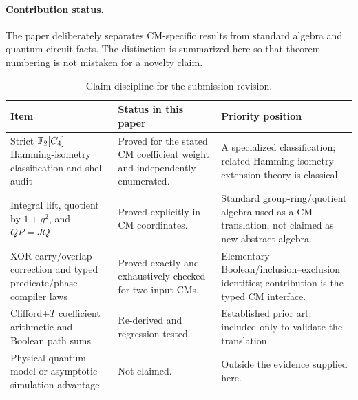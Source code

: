 \paragraph{Contribution status.}
The paper deliberately separates CM-specific results from standard algebra and quantum-circuit facts.  The distinction is summarized here so that theorem numbering is not mistaken for a novelty claim.
\begin{table}[htbp]
\centering\small
\begin{tabularx}{\textwidth}{@{}L{0.30\textwidth}Y L{0.25\textwidth}@{}}
\toprule
Item & Status in this paper & Priority position\\
\midrule
Strict $\mathbb F_2[C_4]$ Hamming-isometry classification and shell audit & Proved for the stated CM coefficient weight and independently enumerated. & A specialized classification; related Hamming-isometry extension theory is classical.\\
Integral lift, quotient by $1+g^2$, and $QP=JQ$ & Proved explicitly in CM coordinates. & Standard group-ring/quotient algebra used as a CM translation, not claimed as new abstract algebra.\\
XOR carry/overlap correction and typed predicate/phase compiler laws & Proved exactly and exhaustively checked for two-input CMs. & Elementary Boolean/inclusion--exclusion identities; contribution is the typed CM interface.\\
Clifford+$T$ coefficient arithmetic and Boolean path sums & Re-derived and regression tested. & Established prior art; included only to validate the translation.\\
Physical quantum model or asymptotic simulation advantage & Not claimed. & Outside the evidence supplied here.\\
\bottomrule
\end{tabularx}
\caption{Claim discipline for the submission revision.}
\label{tab:claimstatus}
\end{table}

